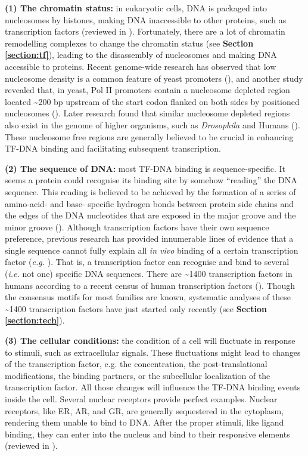 \textbf{(1) The chromatin status:} in eukaryotic cells, DNA is packaged into nucleosomes by histones, making DNA inaccessible to other proteins, such as transcription factors (reviewed in \cite{cairns2009the}). Fortunately, there are a lot of chromatin remodelling complexes to change the chromatin status (see \textbf{Section \ref{section:tf}}), leading to the disassembly of nucleosomes and making DNA accessible to proteins. Recent genome-wide research has observed that low nucleosome density is a common feature of yeast promoters (\cite{lee2004evidence,sekinger2005intrinsic}), and another study revealed that, in yeast, Pol II promoters contain a nucleosome depleted region located \textasciitilde 200 bp upstream of the start codon flanked on both sides by positioned nucleosomes (\cite{yuan2005genome-scale}). Later research found that similar nucleosome depleted regions also exist in the genome of higher organisms, such as \textit{Drosophila} and Humans (\cite{mavrich2008nucleosome,ozsolak2007high-throughput}). These nucleosome free regions are generally believed to be crucial in enhancing TF-DNA binding and facilitating subsequent transcription.

\textbf{(2) The sequence of DNA:} most TF-DNA binding is sequence-specific. It seems a protein could recognise its binding site by somehow \enquote{reading} the DNA sequence. This reading is believed to be achieved by the formation of a series of amino-acid- and base- specific hydrogen bonds between protein side chains and the edges of the DNA nucleotides that are exposed in the major groove and the minor groove (\cite{seeman1976sequence-specific,joshi2007functional,rohs2009the}). Although transcription factors have their own sequence preference, previous research has provided innumerable lines of evidence that a single sequence cannot fully explain all \textit{in vivo} binding of a certain transcription factor (\textit{e.g.} \cite{hollenhorst2009dna}). That is, a transcription factor can recognise and bind to several (\textit{i.e.} not one) specific DNA sequences. There are \textasciitilde 1400 transcription factors in humans according to a recent census of human transcription factors (\cite{vaquerizas2009a}). Though the consensus motifs for most families are known, systematic analyses of these \textasciitilde 1400 transcription factors have just started only recently (see \textbf{Section \ref{section:tech}}).

\textbf{(3) The cellular conditions:} the condition of a cell will fluctuate in response to stimuli, such as extracellular signals. These fluctuations might lead to changes of the transcription factor, e.g. the concentration, the post-translational modifications, the binding partners, or the subcellular localization of the transcription factor. All those changes will influence the TF-DNA binding events inside the cell. Several nuclear receptors provide perfect examples. Nuclear receptors, like ER, AR, and GR, are generally sequestered in the cytoplasm, rendering them unable to bind to DNA. After the proper stimuli, like ligand binding, they can enter into the nucleus and bind to their responsive elements (reviewed in \cite{olefsky2001nuclear}).

